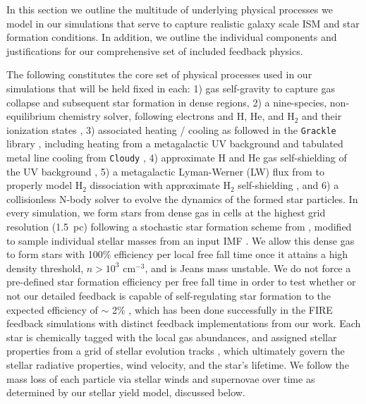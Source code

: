 \documentclass[11pt]{article}
\begin{document}
In this section we outline the multitude of underlying physical processes we model in our simulations that serve to capture realistic galaxy scale ISM and star formation conditions. In addition, we outline the individual components and justifications for our comprehensive set of included feedback physics.

The following constitutes the core set of physical processes used in our simulations that will be held fixed in each: 1) gas self-gravity to capture gas collapse and subsequent star formation in dense regions, 2) a nine-species, non-equilibrium chemistry solver, following electrons and H, He, and H$_{2}$ and their ionization states \citep{Anninos1997, Abel1997}, 3) associated heating / cooling as followed in the \texttt{Grackle} library \citep{Grackle}, including heating from a metagalactic UV background \citep{HM2012} and tabulated metal line cooling from \texttt{Cloudy} \citep{Cloudy2013}, 4) approximate H and He gas self-shielding of the UV background \citep{Rahmati2013}, 5) a metagalactic Lyman-Werner (LW) flux from \cite{HM2012} to properly model H$_{2}$ dissociation with approximate H$_{2}$ self-shielding \citep{Wolcott-Green2011}, and 6) a collisionless N-body solver to evolve the dynamics of the formed star particles. In every simulation, we form stars from dense gas in cells at the highest grid resolution (1.5~pc) following a stochastic star formation scheme from \cite{Goldbaum2015, Goldbaum2016}, modified to sample individual stellar masses from an input IMF \citep[e.g.][]{Salpeter1955}. We allow this dense gas to form stars with 100\% efficiency per local free fall time once it attains a high density threshold, $n > 10^{3}$ cm$^{-3}$, and is Jeans mass unstable. We do not force a pre-defined star formation efficiency per free fall time in order to test whether or not our detailed feedback is capable of self-regulating star formation to the expected efficiency of $\sim$ 2\% \citep{Kennicutt1998}, which has been done successfully in the FIRE feedback simulations \citep[e.g][]{FIRE} with distinct feedback implementations from our work. Each star is chemically tagged with the local gas abundances, and assigned stellar properties from a grid of stellar evolution tracks \citep{Bressan2012}, which ultimately govern the stellar radiative properties, wind velocity, and the star's lifetime. We follow the mass loss of each particle via stellar winds and supernovae over time as determined by our stellar yield model, discussed below.
\end{document}

